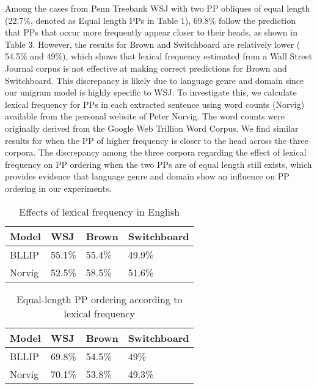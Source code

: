 \documentclass[11pt,letterpaper]{article}
\begin{document}
Among the cases from Penn Treebank WSJ with two PP obliques of equal length (22.7\%, denoted as Equal length PPs in Table 1), 69.8\% follow the prediction that PPs that occur more frequently appear closer to their heads, as shown in Table 3. However, the results for Brown and Switchboard are relatively lower ( 54.5\% and 49\%), which shows that lexical frequency estimated from a Wall Street Journal corpus is not effective at making correct predictions for Brown and Switchboard. This discrepancy is likely due to language genre and domain since our unigram model is highly specific to WSJ. To investigate this, we calculate lexical frequency for PPs in each extracted sentence using word counts (Norvig) available from the personal website of Peter Norvig. The word counts were originally derived from the Google Web Trillion Word Corpus. We find similar results for when the PP of higher frequency is closer to the head across the three corpora. The discrepancy among the three corpora regarding the effect of lexical frequency on PP ordering when the two PPs are of equal length still exists, which provides evidence that language genre and domain show an influence on PP ordering in our experiments.

\begin{table}[h!]
\small
\centering
				\begin{tabular}{|p{2cm}|p{1cm}|p{1cm}|p{2cm}|}
		\hline
	Model &	WSJ & Brown & Switchboard \\ \hline
	BLLIP & 55.1\% & 55.4\% & 49.9\% \\
	Norvig & 52.5\% & 58.5\% & 51.6\% \\
	\hline
				\end{tabular}	
		\caption{Effects of lexical frequency in English}
		\end{table}
		
\begin{table}[h!]
\small
\centering
				\begin{tabular}{|p{2cm}|p{1cm}|p{1cm}|p{2cm}|}
		\hline
	Model &	WSJ & Brown & Switchboard \\ \hline
	BLLIP & 69.8\% & 54.5\% & 49\% \\
	Norvig& 70.1\% & 53.8\% & 49.3\% \\
	\hline
				\end{tabular}	
		\caption{ Equal-length PP ordering according to lexical frequency}
		\end{table}
		
\end{document}

